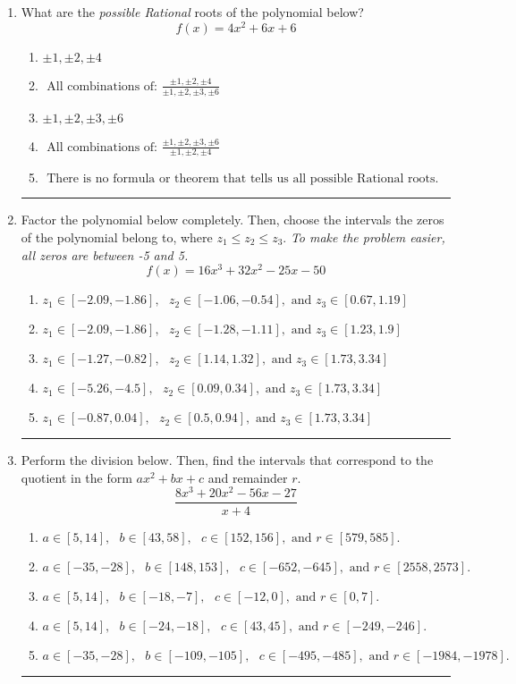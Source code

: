 \documentclass[14pt]{extbook}
\newcommand{\litem}[1]{\item#1\hspace*{-1cm}\rule{\textwidth}{0.4pt}}
\begin{document}
\begin{enumerate}
{\begin{enumerate}[label=\Alph*.]
\end{enumerate} }
\litem{
What are the \textit{possible Rational} roots of the polynomial below?\[ f(x) = 4x^{2} +6 x + 6 \]\begin{enumerate}[label=\Alph*.]
\item \( \pm 1,\pm 2,\pm 4 \)
\item \( \text{ All combinations of: }\frac{\pm 1,\pm 2,\pm 4}{\pm 1,\pm 2,\pm 3,\pm 6} \)
\item \( \pm 1,\pm 2,\pm 3,\pm 6 \)
\item \( \text{ All combinations of: }\frac{\pm 1,\pm 2,\pm 3,\pm 6}{\pm 1,\pm 2,\pm 4} \)
\item \( \text{ There is no formula or theorem that tells us all possible Rational roots.} \)

\end{enumerate} }
\litem{
Factor the polynomial below completely. Then, choose the intervals the zeros of the polynomial belong to, where $z_1 \leq z_2 \leq z_3$. \textit{To make the problem easier, all zeros are between -5 and 5.}\[ f(x) = 16x^{3} +32 x^{2} -25 x -50 \]\begin{enumerate}[label=\Alph*.]
\item \( z_1 \in [-2.09, -1.86], \text{   }  z_2 \in [-1.06, -0.54], \text{   and   } z_3 \in [0.67, 1.19] \)
\item \( z_1 \in [-2.09, -1.86], \text{   }  z_2 \in [-1.28, -1.11], \text{   and   } z_3 \in [1.23, 1.9] \)
\item \( z_1 \in [-1.27, -0.82], \text{   }  z_2 \in [1.14, 1.32], \text{   and   } z_3 \in [1.73, 3.34] \)
\item \( z_1 \in [-5.26, -4.5], \text{   }  z_2 \in [0.09, 0.34], \text{   and   } z_3 \in [1.73, 3.34] \)
\item \( z_1 \in [-0.87, 0.04], \text{   }  z_2 \in [0.5, 0.94], \text{   and   } z_3 \in [1.73, 3.34] \)

\end{enumerate} }
\litem{
Perform the division below. Then, find the intervals that correspond to the quotient in the form $ax^2+bx+c$ and remainder $r$.\[ \frac{8x^{3} +20 x^{2} -56 x -27}{x + 4} \]\begin{enumerate}[label=\Alph*.]
\item \( a \in [5, 14], \text{   } b \in [43, 58], \text{   } c \in [152, 156], \text{   and   } r \in [579, 585]. \)
\item \( a \in [-35, -28], \text{   } b \in [148, 153], \text{   } c \in [-652, -645], \text{   and   } r \in [2558, 2573]. \)
\item \( a \in [5, 14], \text{   } b \in [-18, -7], \text{   } c \in [-12, 0], \text{   and   } r \in [0, 7]. \)
\item \( a \in [5, 14], \text{   } b \in [-24, -18], \text{   } c \in [43, 45], \text{   and   } r \in [-249, -246]. \)
\item \( a \in [-35, -28], \text{   } b \in [-109, -105], \text{   } c \in [-495, -485], \text{   and   } r \in [-1984, -1978]. \)


\end{enumerate}}
\end{enumerate}
\end{document}
